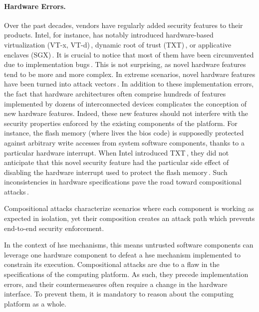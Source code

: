 \paragraph{Hardware Errors.}
%
Over the past decades, vendors have regularly added security features to their
products.
%
Intel, for instance, has notably introduced hardware-based virtualization (VT-x,
VT-d)\,\cite{intel2014manualvt}, dynamic root of trust
(TXT)\,\cite{intel2015txt}, or applicative enclaves
(SGX)\,\cite{intel2014manualsgx,costan2016sgxexplained}.
%
It is crucial to notice that most of them have been circumvented due to
implementation bugs\,\cite{wojtczuk2011txtbug,sang2010iommu}.
%
This is not surprising, as novel hardware features tend to be more and more
complex.
%
In extreme scenarios, novel hardware features have been turned into attack
vectors\,\cite{wojtczuk2011txtbug}.
%
In addition to these implementation errors, the fact that hardware architectures
often comprise hundreds of features implemented by dozens of interconnected
devices complicates the conception of new hardware features.
%
Indeed, these new features should not interfere with the security properties
enforced by the existing components of the platform.
%
For instance, the flash memory (where lives the \ac{bios} code) is supposedly
protected against arbitrary write accesses from system software components,
thanks to a particular hardware interrupt.
%
When Intel introduced TXT\,\cite{intel2015txt}, they did not anticipate that
this novel security feature had the particular side effect of disabling the
hardware interrupt used to protect the flash memory\,\cite{kovah2015senter}.
%
Such inconsistencies in hardware specifications pave the road toward
compositional attacks\,\cite{wing2003compositionalattack}.

\begin{definition}
  Compositional attacks characterize scenarios where each component is working
  as expected in isolation, yet their composition creates an attack path which
  prevents end-to-end security enforcement.
\end{definition}

In the context of \ac{hse} mechanisms, this means untrusted software components
can leverage one hardware component to defeat a \ac{hse} mechanism implemented
to constrain its execution.
%
%
Compositional attacks are due to a flaw in the specifications of the computing
platform.
%
As such, they precede implementation errors, and their countermeasures often
require a change in the hardware interface.
%
To prevent them, it is mandatory to reason about the computing platform as a
whole.


